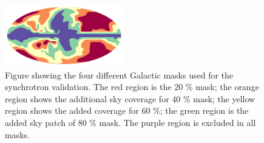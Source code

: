 \documentclass[twocolumn]{aastex631}
\begin{document}
\begin{figure}
    \centering
    \includegraphics[width=0.46\textwidth]{figures/SYNC_mask_stack.png}
    \caption{Figure showing the four different Galactic masks used for the synchrotron validation. The red region is the 20 \% mask; the orange region shows the additional sky coverage for 40 \% mask; the yellow region shows the added coverage for 60 \%; the green region is the added sky patch of 80 \% mask. The purple region is excluded in all masks. }
    \label{fig:sync_masks}
\end{figure}

\end{document}

